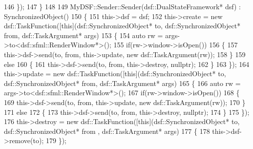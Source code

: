 \begin{DoxyCodeInclude}
146                   \});
147 \}
148 
149 MyDSF::Sender::Sender(dsf::DualStateFramework* dsf)  : SynchronizedObject()
150 \{
151     this->dsf = dsf;
152     this->create = \textcolor{keyword}{new} dsf::TaskFunction([\textcolor{keyword}{this}](dsf::SynchronizedObject* to, dsf::SynchronizedObject* from,
       dsf::TaskArgument* args)
153                                          \{
154                                              \textcolor{keyword}{auto} rw = args->to<dsf::sfml::RenderWindow*>();
155                                              \textcolor{keywordflow}{if}(rw->window->isOpen())
156                                              \{
157                                                  this->dsf->send(to, from, this->update, \textcolor{keyword}{new} 
      dsf::TaskArgument(rw));
158                                              \}
159                                              \textcolor{keywordflow}{else}
160                                              \{
161                                                  this->dsf->send(to, from, this->destroy, \textcolor{keyword}{nullptr});
162                                              \}
163                                          \});
164     this->update = \textcolor{keyword}{new} dsf::TaskFunction([\textcolor{keyword}{this}](dsf::SynchronizedObject* to, dsf::SynchronizedObject* from,
       dsf::TaskArgument* args)
165                                          \{
166                                              \textcolor{keyword}{auto} rw = args->to<dsf::sfml::RenderWindow*>();
167                                              \textcolor{keywordflow}{if}(rw->window->isOpen())
168                                              \{
169                                                  this->dsf->send(to, from, this->update, \textcolor{keyword}{new} 
      dsf::TaskArgument(rw));
170                                              \}
171                                              \textcolor{keywordflow}{else}
172                                              \{
173                                                  this->dsf->send(to, from, this->destroy, \textcolor{keyword}{nullptr});
174                                              \}
175                                          \});
176     this->destroy = \textcolor{keyword}{new} dsf::TaskFunction([\textcolor{keyword}{this}](dsf::SynchronizedObject* to, dsf::SynchronizedObject* from
      , dsf::TaskArgument* args)
177                                           \{
178                                               this->dsf->remove(to);
179                                           \});

\end{DoxyCodeInclude}
